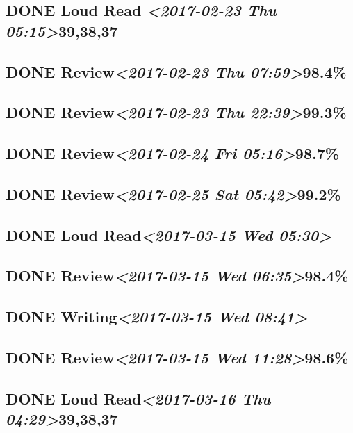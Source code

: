 \documentclass[11pt]{ctexart}
\begin{document}
\subsection{{\bfseries\sffamily DONE} Loud Read \textit{<2017-02-23 Thu 05:15>}39,38,37}
\label{sec:org7d6eb3a}
\subsection{{\bfseries\sffamily DONE} Review\textit{<2017-02-23 Thu 07:59>}98.4\%}
\label{sec:orgfc7c4aa}
\subsection{{\bfseries\sffamily DONE} Review\textit{<2017-02-23 Thu 22:39>}99.3\%}
\label{sec:orgb3ca62c}
\subsection{{\bfseries\sffamily DONE} Review\textit{<2017-02-24 Fri 05:16>}98.7\%}
\label{sec:org6630066}
\subsection{{\bfseries\sffamily DONE} Review\textit{<2017-02-25 Sat 05:42>}99.2\%}
\label{sec:org63c2d9f}
\subsection{{\bfseries\sffamily DONE} Loud Read\textit{<2017-03-15 Wed 05:30>}}
\label{sec:org1c339f2}
\subsection{{\bfseries\sffamily DONE} Review\textit{<2017-03-15 Wed 06:35>}98.4\%}
\label{sec:org00012e1}
\subsection{{\bfseries\sffamily DONE} Writing\textit{<2017-03-15 Wed 08:41>}}
\label{sec:org8781863}
\subsection{{\bfseries\sffamily DONE} Review\textit{<2017-03-15 Wed 11:28>}98.6\%}
\label{sec:org1e78ade}
\subsection{{\bfseries\sffamily DONE} Loud Read\textit{<2017-03-16 Thu 04:29>}39,38,37}
\label{sec:org6f023b9}
\end{document}
